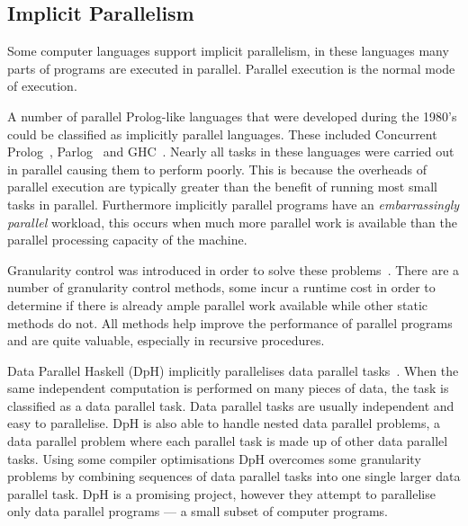 \subsection{Implicit Parallelism}
\label{sec:lit_implicit-parallelism}

Some computer languages support implicit parallelism, in these
languages many parts of programs are executed in parallel.  Parallel
execution is the normal mode of execution.

A number of parallel Prolog-like languages that were developed during the
1980's could be classified as implicitly parallel languages.
These included Concurrent
Prolog~\cite{saraswat85:probl_with_concur_prolog,saraswat86:concurrent_prolog_definition,shapiro:flat_concur_prolog},
Parlog~\cite{parlog,clark84:parlog_sys_prog} and GHC~\cite{ueda:ghc}.
Nearly all tasks in these languages were carried out in
parallel causing them to perform poorly.
This is because the overheads of parallel execution are typically
greater than the benefit of running most small tasks in parallel.
Furthermore implicitly parallel programs have an \emph{embarrassingly
  parallel} workload,
this occurs when much more parallel work is available than the parallel
processing capacity of the machine.

Granularity control was introduced in order to solve these
problems~\cite{lopez96:distance_granularity,shen99:granularity_control}.
There are a number of granularity control methods, some incur a
runtime cost in order to determine if there is already ample parallel
work available while other static methods do not.
All methods help improve the performance of parallel programs and are
quite valuable, especially in recursive procedures.

Data Parallel Haskell (DpH) implicitly parallelises data parallel
tasks~\cite{dph:2007:status_report,
  dph:2008:harnessing_the_multicores}.
When the same independent computation is performed on many
pieces of data, the
task is classified as a data parallel task.
Data parallel tasks are usually independent and easy to parallelise.
DpH is also able to handle nested data parallel problems, a
data parallel problem where each parallel task is made up of other
data parallel tasks.
Using some compiler optimisations DpH overcomes some granularity
problems by combining sequences of data parallel tasks into one
single larger data parallel task.
DpH is a promising project,
however they attempt to parallelise only data parallel programs --- a
small subset of computer programs.

